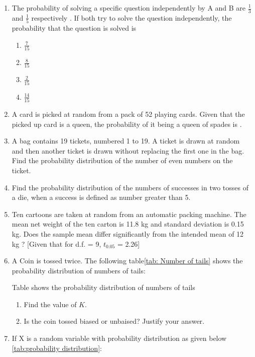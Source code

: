 \begin{enumerate}[label=\thesection.\arabic*.,ref=\thesection.\theenumi]
\item The probability of solving a specific question independently by A and B are $\frac{1}{3}$ and $\frac{1}{5}$ respectively . If both try to solve the question independently, the probability that the question is solved is 
\begin{enumerate}
\item $\frac{7}{15}$
\item $\frac{8}{15}$
\item $\frac{2}{15}$
\item $\frac{14}{15}$
\end{enumerate}
\item A card is picked at random from a pack of 52 playing cards. Given that the picked up card is a queen, the probability of it being a queen of spades is \underline{\hspace{1cm}}.
\item A bag contains 19 tickets, numbered 1 to 19. A ticket is drawn at random and then another ticket is drawn without replacing the first one in the bag. Find the probability distribution of the number of even numbers on the ticket.
\item Find the probability distribution of the numbers of successes in two tosses of a die, when a success is defined as number greater than 5.
\item Ten cartoons are taken at random from an automatic packing machine. The mean net weight of the ten carton is 11.8 kg and standard deviation is 0.15 kg. Does the sample mean differ significantly from the intended mean of 12 kg ?
[Given that for d.f. = 9, $t_{0.05}$ = 2.26]
\item A Coin is tossed twice. The following table\ref{tab: Number of tails} shows the probability distribution of numbers of tails:
\begin{table}[!ht]
	
\caption{Table shows the probability distribution of numbers of tails \label{tab: Number of tails}}
\end{table}
\begin{enumerate}
\item Find the value of $K$.
\item Is the coin tossed biased or unbaised?
Justify your answer.
\end{enumerate}
\item If X is a random variable with probability distribution as given below \ref{tab:probability distribution}:
\begin{table}[!ht]


\end{table}
\end{enumerate}
